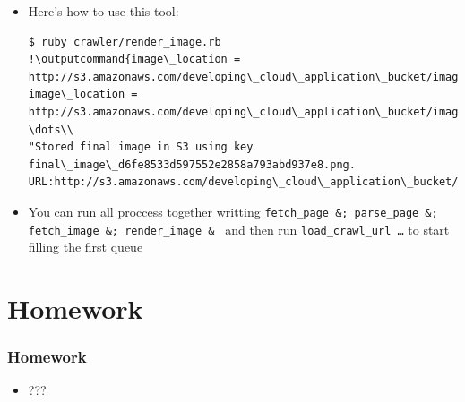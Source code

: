 \documentclass{beamer}
\newcommand{\outputcommand}[1]{\color{darkgreen}{#1|}}
\begin{document}
\begin{frame}
\begin{itemize}
\begin{lstlisting}[escapechar=&]
  output_image_name = "#{JSON.parse(msg.body)['page_title']}.#{Time.now}.png"
  key = 'final_image_' + Digest::MD5.hexdigest(output_image_name) + '.png'
  if upload_object( s3, bucket, key, output_image.to_blob, 'image/png')
    p "Stored final image in S3 using key #{key}. URL:http://s3.amazonaws.com/#{BOOK_BUCKET}/#{key}"
  else
    puts "Error uploading image #{img_url} to S3"
  end
end
\end{lstlisting}
\item Here’s how to use this tool:
\lstset{language=shell}
\begin{lstlisting}[escapechar=!]
$ ruby crawler/render_image.rb 
!\outputcommand{image\_location = http://s3.amazonaws.com/developing\_cloud\_application\_bucket/image\_bfd43e28e9c24b6aa58be89ca9ddf2c1.png\\
image\_location = http://s3.amazonaws.com/developing\_cloud\_application\_bucket/image\_f65b5f3577de03898c83e8d56df44d0a.png\\
\dots\\
"Stored final image in S3 using key final\_image\_d6fe8533d597552e2858a793abd937e8.png. URL:http://s3.amazonaws.com/developing\_cloud\_application\_bucket/final\_image\_d6fe8533d597552e2858a793abd937e8.png"}!
\end{lstlisting}

\item You can run all proccess together writting \texttt{fetch\_page \&; parse\_page \&; fetch\_image \&; render\_image \& } and then run \texttt{load\_crawl\_url \dots} to start filling the first queue
\end{itemize}

\end{frame}
\section{Homework}
\begin{frame}[fragile]
\frametitle{Homework}
\begin{itemize}
\item ???
\end{itemize}
\end{frame}
\end{document}
